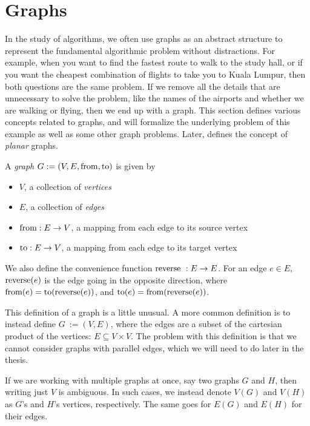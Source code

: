 \section{Graphs}
\label{section:graphs}
In the study of algorithms, we often use graphs as an abstract structure to represent the fundamental algorithmic problem without distractions. For example, when you want to find the fastest route to walk to the study hall, or if you want the cheapest combination of flights to take you to Kuala Lumpur, then both questions are the same problem. If we remove all the details that are unnecessary to solve the problem, like the names of the airports and whether we are walking or flying, then we end up with a graph. This section defines various concepts related to graphs, and  will formalize the underlying problem of this example as well as some other graph problems. Later,  defines the concept of \emph{planar} graphs.

\begin{definition}[Graph]
    A \emph{graph} $G := (V, E, \operatorname{from}, \operatorname{to})$ is given by
\begin{itemize}
    \item $V$, a collection of \emph{vertices}
    \item $E$, a collection of \emph{edges}
    \item $\operatorname{from} : E \rightarrow V$, a mapping from each edge to its source vertex
    \item $\operatorname{to} : E \rightarrow V$, a mapping from each edge to its target vertex 
\end{itemize}
\end{definition}

We also define the convenience function $\operatorname{reverse}~: E \rightarrow E$. For an edge $e \in E$, $\operatorname{reverse}(e)$ is the edge going in the opposite direction, where $\operatorname{from}(e) = \operatorname{to}(\operatorname{reverse}(e))$, and $\operatorname{to}(e) = \operatorname{from}(\operatorname{reverse}(e))$.

This definition of a graph is a little unusual. A more common definition is to instead define $G~:= (V, E)$, where the edges are a subset of the cartesian product of the vertices: $E \subseteq V \times V$. The problem with this definition is that we cannot consider graphs with parallel edges, which we will need to do later in the thesis.

If we are working with multiple graphs at once, say two graphs $G$ and $H$, then writing just $V$ is ambiguous. In such cases, we instead denote $V(G)$ and $V(H)$ as $G$'s and $H$'s vertices, respectively. The same goes for $E(G)$ and $E(H)$ for their edges.

